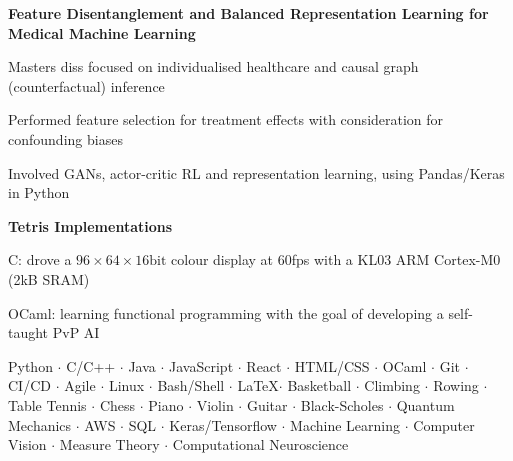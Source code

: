 \documentclass[letterpaper, 10pt]{article}
\begin{document}
\noindent
\begin{changemargin}{.1cm}{0cm}
\textbf{Feature Disentanglement and Balanced Representation Learning for Medical Machine Learning} \hfill \href{https://github.com/alfredclwong/ite-feature-selection}{\faGithub}
    \begin{compact}
        \vspace{-.2\baselineskip}
        \item Masters diss focused on individualised healthcare and causal graph (counterfactual) inference
        \item Performed feature selection for treatment effects with consideration for confounding biases
        \item Involved GANs, actor-critic RL and representation learning, using Pandas/Keras in Python
    \end{compact}
\textbf{Tetris Implementations}
\begin{compact}
	\vspace{-.2\baselineskip}
   \item C: drove a $96\times64\times16\mathrm{bit}$ colour display at 60fps with a KL03 ARM Cortex-M0 (2kB SRAM) \hfill \href{https://github.com/alfredclwong/4b25-tetris}{\faGithub}
   \item OCaml: learning functional programming with the goal of developing a self-taught PvP AI \hfill \href{https://github.com/alfredclwong/tetris-ocaml}{\faGithub}
\end{compact}
\vspace{\baselineskip}
Python $\cdot$ C/C++ $\cdot$ Java $\cdot$ JavaScript $\cdot$ React $\cdot$ HTML/CSS $\cdot$ OCaml $\cdot$ Git $\cdot$ CI/CD $\cdot$ Agile $\cdot$ Linux $\cdot$ Bash/Shell $\cdot$ \LaTeX $\cdot$ Basketball $\cdot$ Climbing $\cdot$ Rowing $\cdot$ Table Tennis  $\cdot$ Chess $\cdot$ Piano $\cdot$ Violin $\cdot$ Guitar $\cdot$ Black-Scholes $\cdot$ Quantum Mechanics $\cdot$ AWS $\cdot$ SQL $\cdot$ Keras/Tensorflow $\cdot$ Machine Learning $\cdot$ Computer Vision $\cdot$ Measure Theory $\cdot$ Computational Neuroscience
\end{changemargin}
\end{document}
